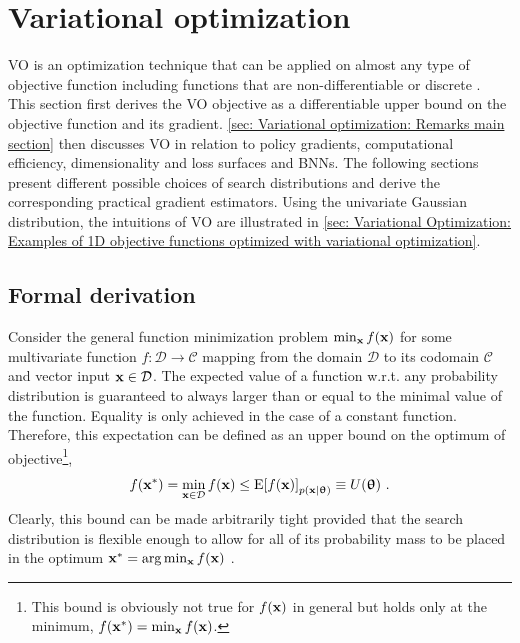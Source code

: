 
\section{Variational optimization}\label{sec: Variational optimization}
\Gls{VO} is an optimization technique that can be applied on almost any type of objective function including functions that are non-differentiable or discrete \cite{Staines2012}. 
This section first derives the \gls{VO} objective as a differentiable upper bound on the objective function and its gradient. 
\autoref{sec: Variational optimization: Remarks main section} then discusses \gls{VO} in relation to policy gradients, computational efficiency, dimensionality and loss surfaces and \glspl{BNN}.
The following sections present different possible choices of search distributions and derive the corresponding practical gradient estimators. Using the univariate Gaussian distribution, the intuitions of \gls{VO} are illustrated in \autoref{sec: Variational Optimization: Examples of 1D objective functions optimized with variational optimization}.


\subsection{Formal derivation}\label{sec: Formal derivation of the variational objective and gradient}
Consider the general function minimization problem $\min_{\mathbf{x}} f({\mathbf{x}})$ for some multivariate function $f: \mathcal{D}\rightarrow\mathcal{C}$ mapping from the domain $\mathcal{D}$ to its codomain $\mathcal{C}$ and vector input ${\mathbf{x}}\in\mathcal{D}$. The expected value of a function w.r.t. any probability distribution is guaranteed to always larger than or equal to the minimal value of the function. Equality is only achieved in the case of a constant function. Therefore, this expectation can be defined as an upper bound on the optimum of objective\footnote{This bound is obviously not true for $f({\mathbf{x}})$ in general but holds only at the minimum, $f({\mathbf{x}}^*)=\min_{{\mathbf{x}}}f({\mathbf{x}})$.},
\begin{equation}\label{eq: Theory: Variational optimization variational upper bound}
    f({\mathbf{x}}^*) = \min_{{\mathbf{x}}\in\mathcal{D}} f({\mathbf{x}}) \leq \text{E}{\left[f({\mathbf{x}})\right]}_{p({\mathbf{x}}|{{\boldsymbol{\uptheta}}})} \equiv U({{\boldsymbol{\uptheta}}}) \ .
\end{equation}
Clearly, this bound can be made arbitrarily tight provided that the search distribution is flexible enough to allow for all of its probability mass to be placed in the optimum ${\mathbf{x}}^*=\arg\min_{\mathbf{x}} f({\mathbf{x}})$ \cite{Staines2012}.

